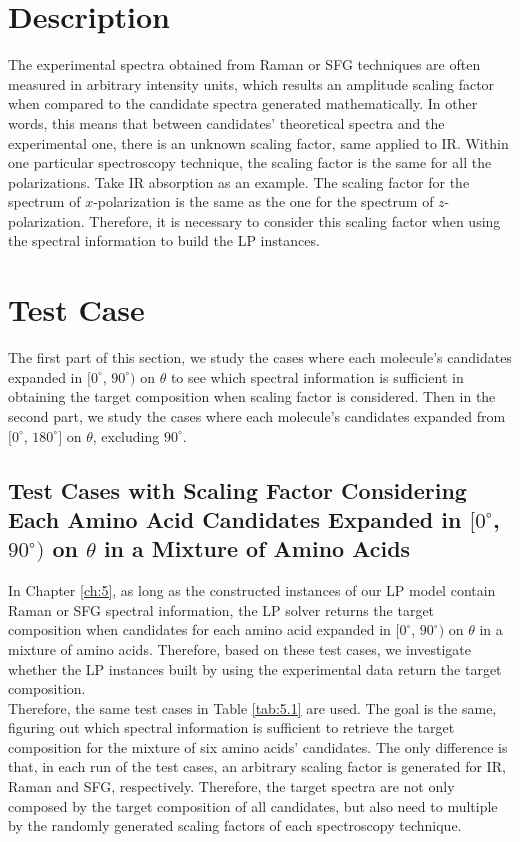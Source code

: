  \label{ch:6}
\section{Description}
The experimental spectra obtained from Raman or SFG techniques are often measured in arbitrary intensity units, which results an amplitude scaling factor when compared to the candidate spectra generated mathematically. In other words, this means that between candidates' theoretical spectra and the experimental one, there is an unknown scaling factor, same applied to IR. Within one particular spectroscopy technique, the scaling factor is the same for all the polarizations. Take IR absorption as an example. The scaling factor for the spectrum of $x$-polarization is the same as the one for the spectrum of $z$-polarization. Therefore, it is necessary to consider this scaling factor when using the spectral information to build the LP instances. \\

\section{Test Case}
The first part of this section, we study the cases where each molecule's candidates expanded in $[0^{\circ}$, $90^{\circ})$ on $\theta$ to see which spectral information is sufficient in obtaining the target composition when scaling factor is considered. Then in the second part, we study the cases where each molecule's candidates expanded from $[0^{\circ}$, $180^{\circ}]$ on $\theta$, excluding $90^{\circ}$. \\

\subsection{Test Cases with Scaling Factor Considering Each Amino Acid Candidates Expanded in $[0^{\circ}$, $90^{\circ})$ on $\theta$ in a Mixture of Amino Acids}
In Chapter \ref{ch:5}, as long as the constructed instances of our LP model contain Raman or SFG spectral information, the LP solver returns the target composition when candidates for each amino acid expanded in $[0^{\circ}$, $90^{\circ})$ on $\theta$ in a mixture of amino acids. Therefore, based on these test cases, we investigate whether the LP instances built by using the experimental data return the target composition.\\

Therefore, the same test cases in Table \ref{tab:5.1} are used. The goal is the same, figuring out which spectral information is sufficient to retrieve the target composition for the mixture of six amino acids' candidates. The only difference is that, in each run of the test cases, an arbitrary scaling factor is generated for IR, Raman and SFG, respectively. Therefore, the target spectra are not only composed by the target composition of all candidates, but also need to multiple by the randomly generated scaling factors of each spectroscopy technique. \\

